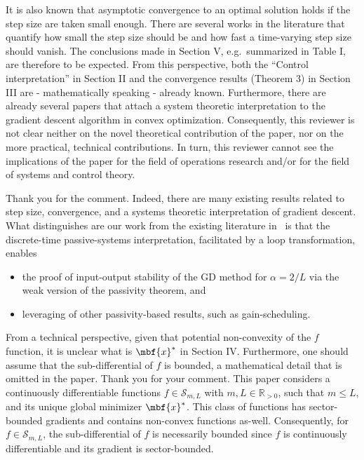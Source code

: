 \begin{rebuttal}[resolved]
    {%
        It is also known that asymptotic convergence to an optimal solution holds if the step size are taken small enough. There are several works in the literature that quantify how small the step size should be and how fast a time-varying step size should vanish. The conclusions made in Section V, e.g.\ summarized in Table I,  are therefore to be expected. From this perspective, both the ``Control interpretation'' in Section II  and the convergence results (Theorem 3) in Section III are - mathematically speaking - already known. Furthermore, there are already several papers that attach a system theoretic interpretation to the gradient descent algorithm in convex optimization. Consequently, this reviewer is not clear neither on the novel theoretical contribution of the paper, nor on the more practical, technical contributions. In turn, this reviewer cannot see the implications of the paper for the field of operations research and/or for the field of systems and control theory.
    }%
    {%
        Thank you for the comment. Indeed, there are many existing results related to step size, convergence, and a systems theoretic interpretation of gradient descent. What distinguishes are our work from the existing literature in~\cite{ugrinovskii,alex_petersen,hu_lessard,lessard_dissipativity,simpson} is that the discrete-time passive-systems interpretation, facilitated by a loop transformation, enables 
        \begin{itemize}
            \item{%
                the proof of input-output stability of the GD method for \(\alpha = 2/L\) via the weak version of the passivity theorem, and
            }%
            \item{%
                leveraging of other passivity-based results, such as gain-scheduling.
            }%
        \end{itemize}
    }%
\end{rebuttal}
\begin{rebuttal}[stuck]
    {%
    From a technical perspective, given that potential non-convexity of the $f$ function, it is unclear what is $\mbf{x}^{\ast}$ in Section IV\@. Furthermore, one should assume that the sub-differential of $f$ is bounded, a mathematical detail that is omitted in the paper.
    }%
    {%
        Thank you for your comment. This paper considers a continuously differentiable functions \(f \in \mathcal{S}_{m, L}\) with \(m, L \in \mathbb{R}_{>0}\), such that \(m \leq L\), and its unique global minimizer \(\mbf{x}^\ast\). This class of functions has sector-bounded gradients and contains non-convex functions as-well. Consequently, for \(f \in \mathcal{S}_{m, L}\), the sub-differential of \(f\) is necessarily bounded since \(f\) is continuously differentiable and its gradient is sector-bounded.
    }%
\end{rebuttal}
